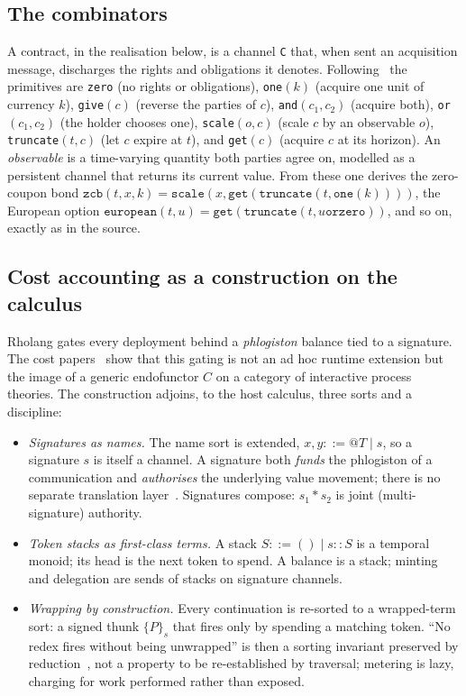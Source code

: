 \documentclass[11pt]{article}
\theoremstyle{definition}
\theoremstyle{plain}
\newcommand{\wrap}[2]{\ensuremath{\{#1\}_{#2}}}
\begin{document}
\subsection{The combinators}

A contract, in the realisation below, is a channel \texttt{C} that, when sent an acquisition message,
discharges the rights and obligations it denotes. Following~\cite{SPJ2000} the primitives are
\texttt{zero} (no rights or obligations), \texttt{one}$(k)$ (acquire one unit of currency $k$),
\texttt{give}$(c)$ (reverse the parties of $c$), \texttt{and}$(c_1,c_2)$ (acquire both),
\texttt{or}$(c_1,c_2)$ (the holder chooses one), \texttt{scale}$(o,c)$ (scale $c$ by an observable
$o$), \texttt{truncate}$(t,c)$ (let $c$ expire at $t$), and \texttt{get}$(c)$ (acquire $c$ at its
horizon). An \emph{observable} is a time-varying quantity both parties agree on, modelled as a
persistent channel that returns its current value. From these one derives the zero-coupon bond
$\texttt{zcb}(t,x,k) = \texttt{scale}(x,\texttt{get}(\texttt{truncate}(t,\texttt{one}(k))))$, the
European option $\texttt{european}(t,u) = \texttt{get}(\texttt{truncate}(t, u \mathbin{\texttt{or}}
\texttt{zero}))$, and so on, exactly as in the source.

\subsection{Cost accounting as a construction on the calculus}

Rholang gates every deployment behind a \emph{phlogiston} balance tied to a signature. The cost
papers~\cite{CAR2026,CGC2026} show that this gating is not an ad hoc runtime extension but the image
of a generic endofunctor $C$ on a category of interactive process theories. The construction
adjoins, to the host calculus, three sorts and a discipline:

\begin{itemize}[leftmargin=1.4em,itemsep=2pt]
\item \emph{Signatures as names.} The name sort is extended, $x,y ::= @T \mid s$, so a signature $s$
is itself a channel. A signature both \emph{funds} the phlogiston of a communication and
\emph{authorises} the underlying value movement; there is no separate translation
layer~\cite[\S5.1]{CAR2026}. Signatures compose: $s_1 * s_2$ is joint (multi-signature) authority.
\item \emph{Token stacks as first-class terms.} A stack $S ::= () \mid s :: S$ is a temporal monoid;
its head is the next token to spend. A balance is a stack; minting and delegation are sends of
stacks on signature channels.
\item \emph{Wrapping by construction.} Every continuation is re-sorted to a wrapped-term sort: a
signed thunk $\wrap{P}{s}$ that fires only by spending a matching token. ``No redex fires without
being unwrapped'' is then a sorting invariant preserved by reduction~\cite[\S3]{CGC2026}, not a
property to be re-established by traversal; metering is lazy, charging for work performed rather than
exposed.
\end{itemize}
\end{document}
